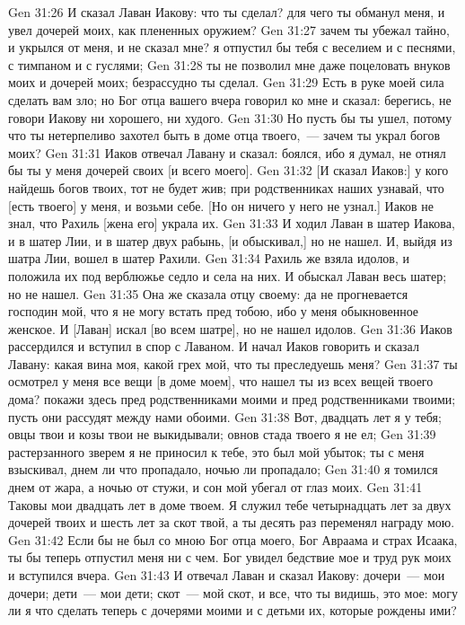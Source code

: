 \vs Gen 31:26 И сказал Лаван Иакову: что ты сделал? для чего ты обманул меня, и увел дочерей моих, как плененных оружием?
\vs Gen 31:27 зачем ты убежал тайно, и укрылся от меня, и не сказал мне? я отпустил бы тебя с веселием и с песнями, с тимпаном и с гуслями;
\vs Gen 31:28 ты не позволил мне даже поцеловать внуков моих и дочерей моих; безрассудно ты сделал.
\vs Gen 31:29 Есть в руке моей сила сделать вам зло; но Бог отца вашего вчера говорил ко мне и сказал: берегись, не говори Иакову ни хорошего, ни худого.
\vs Gen 31:30 Но пусть бы ты ушел, потому что ты нетерпеливо захотел быть в доме отца твоего,~--- зачем ты украл богов моих?
\vs Gen 31:31 Иаков отвечал Лавану и сказал:  боялся, ибо я думал, не отнял бы ты у меня дочерей своих [и всего моего].
\vs Gen 31:32 [И сказал Иаков:] у кого найдешь богов твоих, тот не будет жив; при родственниках наших узнавай, что [есть твоего] у меня, и возьми себе. [Но он ничего у него не узнал.] Иаков не знал, что Рахиль [жена его] украла их.
\vs Gen 31:33 И ходил Лаван в шатер Иакова, и в шатер Лии, и в шатер двух рабынь, [и обыскивал,] но не нашел. И, выйдя из шатра Лии, вошел в шатер Рахили.
\vs Gen 31:34 Рахиль же взяла идолов, и положила их под верблюжье седло и села на них. И обыскал Лаван весь шатер; но не нашел.
\vs Gen 31:35 Она же сказала отцу своему: да не прогневается господин мой, что я не могу встать пред тобою, ибо у меня обыкновенное женское. И [Лаван] искал [во всем шатре], но не нашел идолов.
\vs Gen 31:36 Иаков рассердился и вступил в спор с Лаваном. И начал Иаков говорить и сказал Лавану: какая вина моя, какой грех мой, что ты преследуешь меня?
\vs Gen 31:37 ты осмотрел у меня все вещи [в доме моем], что нашел ты из всех вещей твоего дома? покажи здесь пред родственниками моими и пред родственниками твоими; пусть они рассудят между нами обоими.
\vs Gen 31:38 Вот, двадцать лет я  у тебя; овцы твои и козы твои не выкидывали; овнов стада твоего я не ел;
\vs Gen 31:39 растерзанного зверем я не приносил к тебе, это был мой убыток; ты с меня взыскивал, днем ли что пропадало, ночью ли пропадало;
\vs Gen 31:40 я томился днем от жара, а ночью от стужи, и сон мой убегал от глаз моих.
\vs Gen 31:41 Таковы мои двадцать лет в доме твоем. Я служил тебе четырнадцать лет за двух дочерей твоих и шесть лет за скот твой, а ты десять раз переменял награду мою.
\vs Gen 31:42 Если бы не был со мною Бог отца моего, Бог Авраама и страх Исаака, ты бы теперь отпустил меня ни с чем. Бог увидел бедствие мое и труд рук моих и вступился  вчера.
\vs Gen 31:43 И отвечал Лаван и сказал Иакову: дочери~--- мои дочери; дети~--- мои дети; скот~--- мой скот, и все, что ты видишь, это мое: могу ли я что сделать теперь с дочерями моими и с детьми их, которые рождены ими?
